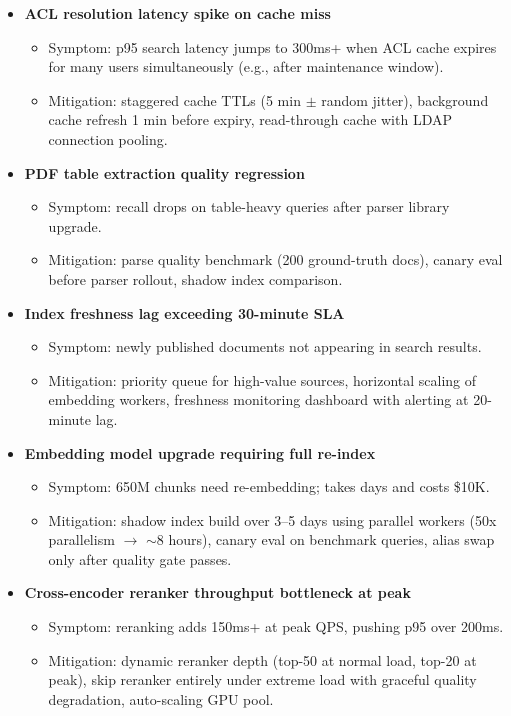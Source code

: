 \begin{itemize}
  \item \textbf{ACL resolution latency spike on cache miss}
  \begin{itemize}
    \item Symptom: p95 search latency jumps to 300ms+ when ACL cache expires for many users simultaneously (e.g., after maintenance window).
    \item Mitigation: staggered cache TTLs (5 min $\pm$ random jitter), background cache refresh 1 min before expiry, read-through cache with LDAP connection pooling.
  \end{itemize}

  \item \textbf{PDF table extraction quality regression}
  \begin{itemize}
    \item Symptom: recall drops on table-heavy queries after parser library upgrade.
    \item Mitigation: parse quality benchmark (200 ground-truth docs), canary eval before parser rollout, shadow index comparison.
  \end{itemize}

  \item \textbf{Index freshness lag exceeding 30-minute SLA}
  \begin{itemize}
    \item Symptom: newly published documents not appearing in search results.
    \item Mitigation: priority queue for high-value sources, horizontal scaling of embedding workers, freshness monitoring dashboard with alerting at 20-minute lag.
  \end{itemize}

  \item \textbf{Embedding model upgrade requiring full re-index}
  \begin{itemize}
    \item Symptom: 650M chunks need re-embedding; takes days and costs \$10K.
    \item Mitigation: shadow index build over 3--5 days using parallel workers (50x parallelism $\rightarrow$ $\sim$8 hours), canary eval on benchmark queries, alias swap only after quality gate passes.
  \end{itemize}

  \item \textbf{Cross-encoder reranker throughput bottleneck at peak}
  \begin{itemize}
    \item Symptom: reranking adds 150ms+ at peak QPS, pushing p95 over 200ms.
    \item Mitigation: dynamic reranker depth (top-50 at normal load, top-20 at peak), skip reranker entirely under extreme load with graceful quality degradation, auto-scaling GPU pool.
  \end{itemize}


\end{itemize}
